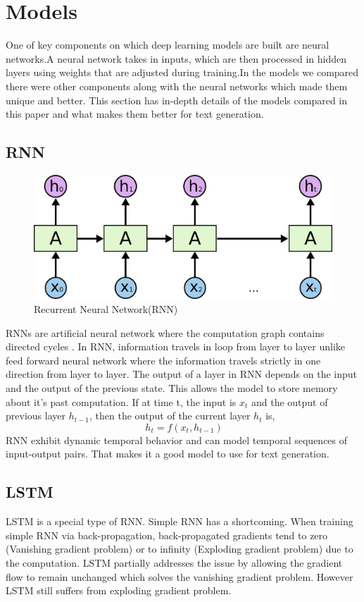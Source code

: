 \documentclass[11pt,a4paper]{article}
\begin{document}
\section{Models}
One of key components on which deep learning models are built are neural networks.A neural network takes in inputs, which are then processed in hidden layers using weights that are adjusted during training.In the models we compared there were other components along with the neural networks which made them unique and better. This section has in-depth details of the models compared in this paper and what makes them better for text generation.

\subsection{RNN}

\begin{figure}[h]
\includegraphics[width=\columnwidth]{RNN.png}
\caption{Recurrent Neural Network(RNN)}
\end{figure}

RNNs are artificial neural network where the computation graph contains directed cycles \cite{mikolov2010recurrent}. In RNN, information travels in loop from layer to layer unlike feed forward neural network where the information travels strictly in one direction from layer to layer. The output of a layer in RNN depends on the input and the output of the previous state. This allows the model to store memory about it's past computation. If at time t, the input is \(x_t\) and the output of previous layer \(h_{t-1}\), then the output of the current layer \(h_t\) is,
\begin{equation}
   \ h_t = f(x_t, h_{t-1})
\end{equation}
RNN exhibit dynamic temporal behavior and can model temporal sequences of input-output pairs. That makes it a good model to use for text generation.

\subsection{LSTM}
LSTM is a special type of RNN. Simple RNN has a shortcoming. When training simple RNN via back-propagation, back-propagated gradients tend to zero (Vanishing gradient problem) or to infinity (Exploding gradient problem) due to the computation\cite{gers1999learning}. LSTM partially addresses the issue by allowing the gradient flow to remain unchanged which solves the vanishing gradient problem. However LSTM still suffers from exploding gradient problem.
\end{document}
